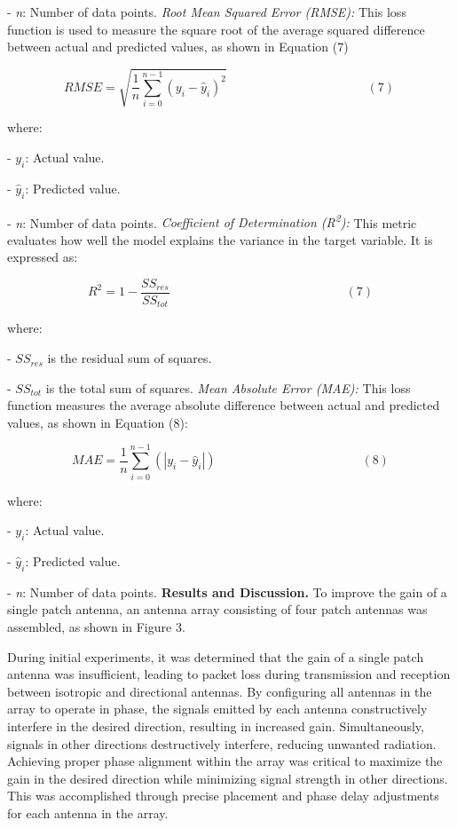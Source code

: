 \begin{multicols}{2}
- \emph{n}: Number of data points.
\emph{Root Mean Squared Error (RMSE):} This loss function is used to
measure the square root of the average squared difference between actual
and predicted values, as shown in Equation (7)

\[RMSE = \sqrt{\frac{1}{n}\sum_{i = 0}^{n - 1}{(y_{i} - {\widehat{y}}_{i})}^{2}}\ \ \ \ \ \ \ \ \ \ \ \ \ \ \ \ \ \ \ \ \ \ \ \ \ \ \ \ \ \ \ \ \ \ \ \ \ \ \ \ \ \ \ \ \ \ \ \ \ \ \ (7)\ \]

where:


- \(y_{i}\): Actual value.

- \({\widehat{y}}_{i}\)\hspace{0pt}: Predicted value.

- \emph{n}: Number of data points.
\emph{Coefficient of Determination (R\textsuperscript{2}):} This metric
evaluates how well the model explains the variance in the target
variable. It is expressed as:

\[R^{2} = 1 - \frac{{SS}_{res}}{{SS}_{tot}}\ \ \ \ \ \ \ \ \ \ \ \ \ \ \ \ \ \ \ \ \ \ \ \ \ \ \ \ \ \ \ \ \ \ \ \ \ \ \ \ \ \ \ \ \ \ \ \ \ \ \ \ \ \ \ \ \ \ \ \ \ \ \ \ (7)\]

where:


- \({SS}_{res}\) is the residual sum of squares.

- \({SS}_{tot}\) is the total sum of squares.
\emph{Mean Absolute Error (MAE):} This loss function measures the
average absolute difference between actual and predicted values, as
shown in Equation (8):

\[MAE = \frac{1}{n}\sum_{i = 0}^{n - 1}{(|y_{i} - {\widehat{y}}_{i}|)\ }\ \ \ \ \ \ \ \ \ \ \ \ \ \ \ \ \ \ \ \ \ \ \ \ \ \ \ \ \ \ \ \ \ \ \ \ \ \ \ \ \ \ \ \ \ \ \ \ \ \ \ \ (8)\]

where:


- \(y_{i}\): Actual value.

- \({\widehat{y}}_{i}\)\hspace{0pt}: Predicted value.

- \emph{n}: Number of data points.
{\bfseries Results and Discussion.} To improve the gain of a single patch
antenna, an antenna array consisting of four patch antennas was
assembled, as shown in Figure 3.

During initial experiments, it was determined that the gain of a single
patch antenna was insufficient, leading to packet loss during
transmission and reception between isotropic and directional antennas.
By configuring all antennas in the array to operate in phase, the
signals emitted by each antenna constructively interfere in the desired
direction, resulting in increased gain. Simultaneously, signals in other
directions destructively interfere, reducing unwanted radiation.
Achieving proper phase alignment within the array was critical to
maximize the gain in the desired direction while minimizing signal
strength in other directions. This was accomplished through precise
placement and phase delay adjustments for each antenna in the array.
\end{multicols}

